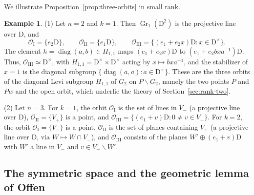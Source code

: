 \documentclass[11pt]{amsart}
\numberwithin{equation}{section}
\theoremstyle{plain}
\theoremstyle{definition}
\newtheorem{example}[theorem]{Example}
\theoremstyle{remark}
\DeclareMathOperator{\Gr}{Gr}
\DeclareMathOperator{\diag}{diag}
\newcommand{\OI}{\mathcal{O}_{\mathrm{I}}}
\newcommand{\OII}{\mathcal{O}_{\mathrm{II}}}
\newcommand{\OIII}{\mathcal{O}_{\mathrm{III}}}
\begin{document}
We illustrate Proposition~\ref{prop:three-orbits} in small rank.

\begin{example}\label{ex:orbits-small}
	(1) Let $n=2$ and $k=1$. Then $\Gr_1(\mathrm{D}^2)$ is the projective line over $\mathrm{D}$, and
	$$
	\OI=\{e_2\mathrm{D}\},\qquad \OII=\{e_1\mathrm{D}\},\qquad \OIII=\{(e_1+e_2x)\mathrm{D}:x\in \mathrm{D}^\times\}.
	$$
	The element $h=\diag(a,b)\in H_{1,1}$ maps $(e_1+e_2x)\mathrm{D}$ to $(e_1+e_2bxa^{-1})\mathrm{D}$. Thus, $\OIII\simeq \mathrm{D}^\times$, with $H_{1,1}=\mathrm{D}^\times\times \mathrm{D}^\times$ acting by $x\mapsto bxa^{-1}$, and the stabilizer of $x=1$ is the diagonal subgroup $\{\diag(a,a):a\in\mathrm{D}^\times\}$. These are the three orbits of the diagonal Levi subgroup $H_{1,1}$ of $G_2$ on $P\backslash G_2$, namely the two points $P$ and $Pw$ and the open orbit, which underlie the theory of Section~\ref{sec:rank-two}.
	
	(2) Let $n=3$. For $k=1$, the orbit $\OI$ is the set of lines in $V_-$ (a projective line over $\mathrm{D}$), $\OII=\{V_+\}$ is a point, and $\OIII=\{(e_1+v)\mathrm{D}:0\ne v\in V_-\}$. For $k=2$, the orbit $\OI=\{V_-\}$ is a point, $\OII$ is the set of planes containing $V_+$ (a projective line over $\mathrm{D}$, via $W\mapsto W\cap V_-$), and $\OIII$ consists of the planes $W'\oplus(e_1+v)\mathrm{D}$ with $W'$ a line in $V_-$ and $v\in V_-\smallsetminus W'$.
\end{example}

\subsection{The symmetric space and the geometric lemma of Offen}\label{ss:offen}
\end{document}
